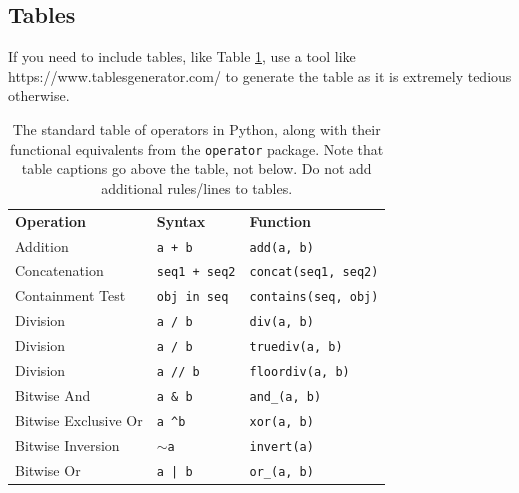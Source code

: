 \documentclass{l4proj}
\begin{document}
\subsection{Tables}

If you need to include tables, like Table \ref{tab:operators}, use a tool like https://www.tablesgenerator.com/ to generate the table as it is
extremely tedious otherwise. 

\begin{table}[]
    \caption{The standard table of operators in Python, along with their functional equivalents from the \texttt{operator} package. Note that table
    captions go above the table, not below. Do not add additional rules/lines to tables. }\label{tab:operators}
    \begin{tabular}{@{}lll@{}}
    \textbf{Operation}    & \textbf{Syntax}                & \textbf{Function}                            \\ %
    Addition              & \texttt{a + b}                          & \texttt{add(a, b)}                                    \\
    Concatenation         & \texttt{seq1 + seq2}                    & \texttt{concat(seq1, seq2)}                           \\
    Containment Test      & \texttt{obj in seq}                     & \texttt{contains(seq, obj)}                           \\
    Division              & \texttt{a / b}                          & \texttt{div(a, b) }  \\
    Division              & \texttt{a / b}                          & \texttt{truediv(a, b) } \\
    Division              & \texttt{a // b}                         & \texttt{floordiv(a, b)}                               \\
    Bitwise And           & \texttt{a \& b}                         & \texttt{and\_(a, b)}                                  \\
    Bitwise Exclusive Or  & \texttt{a \textasciicircum b}           & \texttt{xor(a, b)}                                    \\
    Bitwise Inversion     & \texttt{$\sim$a}                        & \texttt{invert(a)}                                    \\
    Bitwise Or            & \texttt{a | b}                          & \texttt{or\_(a, b)}                                   \\

\end{tabular}
\end{table}
\end{document}
